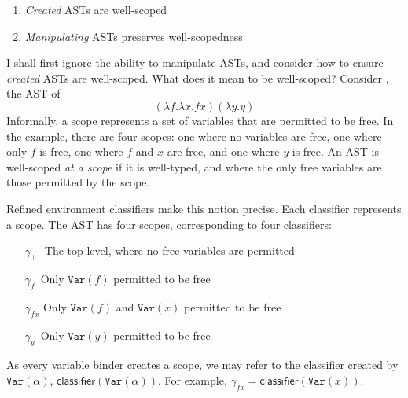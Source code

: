 \begin{enumerate}
  \item \textit{Created} ASTs are well-scoped
  \item \textit{Manipulating} ASTs preserves well-scopedness 
\end{enumerate}

I shall first ignore the ability to manipulate ASTs, and consider how to ensure \textit{created} ASTs are well-scoped. What does it mean to be well-scoped? Consider , the AST of 
\[(\lambda f. \lambda x. f x) (\lambda y. y)\]
Informally, a scope represents a set of variables that are permitted to be free. In the example, there are four scopes: one where no variables are free, one where only $f$ is free, one where $f$ and $x$ are free, and one where $y$ is free. An AST is well-scoped \textit{at a scope} if it is well-typed, and where the only free variables are those permitted by the scope. 

Refined environment classifiers make this notion precise. Each classifier represents a scope. The AST has four scopes, corresponding to four classifiers:
\begin{itemize}
\item[$\gamma_{\bot}$\,\,] The top-level, where no free variables are permitted 
\item[$\gamma_{f}$\;\,] Only $\texttt{Var}(f)$ permitted to be free
\item[$\gamma_{fx}$] Only $\texttt{Var}(f)$ and $\texttt{Var}(x)$ permitted to be free 
\item[$\gamma_{y}$\;\,] Only $\texttt{Var}(y)$ permitted to be free
\end{itemize}
As every variable binder creates a scope, we may refer to the classifier created by $\texttt{Var}(\alpha)$, $\textsf{classifier}(\texttt{Var}(\alpha))$. For example, $\gamma_{fx}= \textsf{classifier}(\texttt{Var}(x))$.

